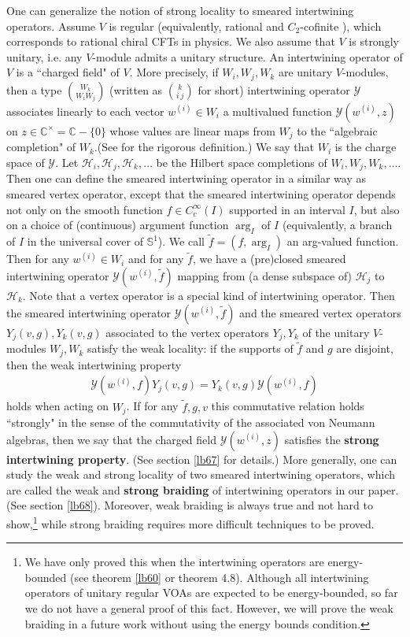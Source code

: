 \documentclass[12pt,a4paper]{article}
\theoremstyle{definition}
\theoremstyle{plain}
\newcommand{\mc}{\mathcal}
\newcommand{\wtd}{\widetilde}
\newcommand{\mbb}{\mathbb}
\numberwithin{equation}{subsection}
\begin{document}
One can generalize the notion of strong locality to smeared intertwining operators. Assume $V$ is regular (equivalently, rational and $C_2$-cofinite \cite{ABD04}), which corresponds to rational chiral CFTs in physics. We also assume that $V$ is strongly unitary, i.e. any $V$-module admits a unitary structure. An intertwining operator of $V$ is a ``charged field" of $V$. More precisely, if $W_i,W_j,W_k$ are unitary $V$-modules, then a type $W_k\choose W_iW_j$ (written as $k\choose i~j$ for short) intertwining operator $\mc Y$ associates linearly to each vector $w^{(i)}\in W_i$  a multivalued function $\mc Y(w^{(i)},z)$ on $z\in\mbb C^\times=\mbb C-\{0\}$ whose values are linear maps from $W_j$ to the ``algebraic completion" of $W_k$.(See \cite{FHL93} for the rigorous definition.)  We say that $W_i$ is the charge space of $\mc Y$.  Let $\mc H_i,\mc H_j,\mc H_k,\dots$ be the Hilbert space completions of $W_i,W_j,W_k,\dots$. Then one can define the smeared intertwining operator in a similar way as smeared vertex operator, except that the smeared intertwining operator depends not only on the smooth function $f\in C_c^\infty(I)$ supported in an interval $I$, but also on a choice of (continuous) argument function $\arg_I$ of $I$ (equivalently, a branch of $I$ in the universal cover of $\mbb S^1$). We call $\wtd f=(f,\arg_I)$ an arg-valued function. Then for any $w^{(i)}\in W_i$ and for any $\wtd f$, we have a (pre)closed smeared intertwining operator $\mc Y(w^{(i)},\wtd f)$ mapping from (a dense subspace of) $\mc H_j$ to $\mc H_k$.  Note that a vertex operator is a special kind of intertwining operator. Then the  smeared intertwining operator $\mc Y(w^{(i)},\wtd f)$ and the smeared vertex operators $Y_j(v,g),Y_k(v,g)$ associated to the vertex operators $Y_j,Y_k$ of the unitary $V$-modules $W_j,W_k$ satisfy the weak locality: if the supports of $\wtd f$ and $g$ are disjoint, then the weak intertwining property
\begin{align*}
\mc Y(w^{(i)},f)Y_j(v,g)=Y_k(v,g)\mc Y(w^{(i)},f)
\end{align*}
holds when acting on $W_j$. If for any $\wtd f,g,v$ this commutative relation holds ``strongly" in the sense of the commutativity of the associated von Neumann algebras, then we say that the charged field $\mc Y(w^{(i)},z)$ satisfies the \textbf{strong intertwining property}. (See section \ref{lb67} for details.) More generally, one can study the weak and strong locality of two smeared intertwining operators, which are called the weak and \textbf{strong braiding} of intertwining operators in our paper. (See section \ref{lb68}). Moreover,  weak braiding is always true and not hard to show,\footnote{We have only proved this when the intertwining operators are energy-bounded (see theorem \ref{lb60} or \cite{Gui21a} theorem 4.8). Although all intertwining operators of unitary regular VOAs are expected to be energy-bounded, so far we do not have a general proof of this fact. However, we will prove the weak braiding in a future work without using the energy bounds condition.} while strong braiding requires more difficult techniques to be proved.
\end{document}
